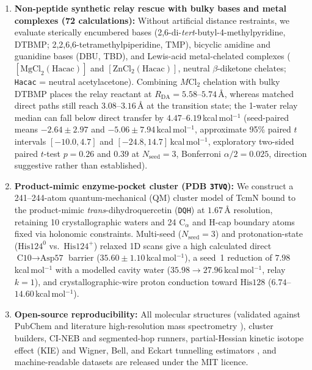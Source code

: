 \documentclass[11pt,a4paper]{article}
\begin{document}
\begin{enumerate}
\item \textbf{Non-peptide synthetic relay rescue with bulky bases and metal complexes (72 calculations):} Without artificial distance restraints, we evaluate sterically encumbered bases (2,6-di-\textit{tert}-butyl-4-methylpyridine, DTBMP; 2,2,6,6-tetramethylpiperidine, TMP), bicyclic amidine and guanidine bases (DBU, TBD), and Lewis-acid metal-chelated complexes ($[\text{MgCl}_2(\text{Hacac})]$ and $[\text{ZnCl}_2(\text{Hacac})]$, neutral $\beta$-diketone chelates; \texttt{Hacac} = neutral acetylacetone). Combining $M\text{Cl}_2$ chelation with bulky DTBMP places the relay reactant at $R_{\text{DA}} = 5.58$--$5.74$\,\AA{}, whereas matched direct paths still reach $3.08$--$3.16$\,\AA{} at the transition state; the 1-water relay median can fall below direct transfer by $4.47$--$6.19$\,kcal\,mol$^{-1}$ (seed-paired means $-2.64 \pm 2.97$ and $-5.06 \pm 7.94$\,kcal\,mol$^{-1}$, approximate 95\% paired $t$ intervals $[-10.0, 4.7]$ and $[-24.8, 14.7]$\,kcal\,mol$^{-1}$, exploratory two-sided paired $t$-test $p = 0.26$ and $0.39$ at $N_{\text{seed}} = 3$, Bonferroni $\alpha/2 = 0.025$, direction suggestive rather than established).
\item \textbf{Product-mimic enzyme-pocket cluster (PDB \texttt{3TVQ}):} We construct a 241--244-atom quantum-mechanical (QM) cluster model of TcmN bound to the product-mimic \textit{trans}-dihydroquercetin (\texttt{DQH}) at $1.67$\,\AA{} resolution, retaining 10 crystallographic waters and 24 $\text{C}_\alpha$ and H-cap boundary atoms fixed via holonomic constraints. Multi-seed ($N_{\text{seed}} = 3$) and protonation-state ($\text{His124}^0$ vs.\ $\text{His124}^+$) relaxed 1D scans give a high calculated direct $\text{C10}\to\text{Asp57}$ barrier ($35.60 \pm 1.10$\,kcal\,mol$^{-1}$), a seed~1 reduction of $7.98$\,kcal\,mol$^{-1}$ with a modelled cavity water ($35.98 \to 27.96$\,kcal\,mol$^{-1}$, relay $k=1$), and crystallographic-wire proton conduction toward $\text{His128}$ ($6.74$--$14.60$\,kcal\,mol$^{-1}$).
\item \textbf{Open-source reproducibility:} All molecular structures (validated against PubChem and literature high-resolution mass spectrometry \cite{hayat1999,krohn2000,corey1995,hess2017}), cluster builders, CI-NEB and segmented-hop runners, partial-Hessian kinetic isotope effect (KIE) and Wigner, Bell, and Eckart tunnelling estimators \cite{bigeleisen1947,wigner1932,eckart1930,johnston1962,skodje1981,venkatasubban1984}, and machine-readable datasets are released under the MIT licence.
\end{enumerate}
\end{document}

